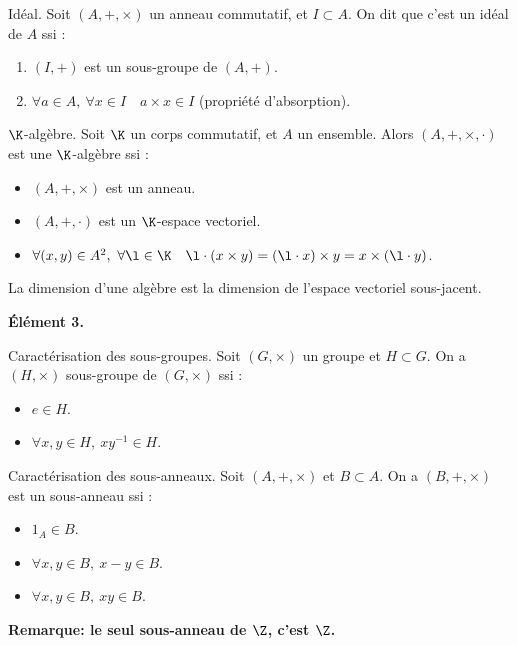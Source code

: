 \documentclass[11pt]{article}
\begin{document}
\begin{defi}{Idéal.  }{}
    Soit $(A,+,\times)$ un anneau commutatif, et $I\subset A$. On dit que c'est un idéal de $A$ ssi :
    \begin{enumerate}
        \item $(I,+)$ est un sous-groupe de $(A,+)$.
        \item $\forall a \in A, ~ \forall x \in I \quad a\times x \in I$ (propriété d'absorption).
    \end{enumerate}
\end{defi}

\begin{defi}{$\K$-algèbre.}{}
    Soit $\K$ un corps commutatif, et $A$ un ensemble. Alors $(A,+,\times,\cdot)$ est une $\K$-algèbre ssi :
    \begin{itemize}
        \item $(A,+,\times)$ est un anneau.
        \item $(A,+,\cdot)$ est un $\K$-espace vectoriel.
        \item $\forall (x,y)\in A^2, ~ \forall \l \in \K \quad \l\cdot(x\times y)=(\l\cdot x) \times y=x\times(\l\cdot y)$.
    \end{itemize}
    La dimension d'une algèbre est la dimension de l'espace vectoriel sous-jacent.
\end{defi}

\begin{center}
    \bf{Élément 3.}
\end{center}

\begin{prop}{Caractérisation des sous-groupes.}{}
    Soit $(G,\times)$ un groupe et $H\subset G$. On a $(H,\times)$ sous-groupe de $(G,\times)$ ssi :
    \begin{itemize}
        \item $e\in H$.
        \item $\forall x,y \in H, ~ xy^{-1}\in H$.
    \end{itemize}
\end{prop}

\begin{prop}{Caractérisation des sous-anneaux.}{}
    Soit $(A,+,\times)$ et $B\subset A$. On a $(B,+,\times)$ est un sous-anneau ssi :
    \begin{itemize}
        \item $1_A\in B$.
        \item $\forall x,y \in B, ~ x-y\in B$.
        \item $\forall x,y \in B, ~ xy\in B$.
    \end{itemize}
    \bf{Remarque:} le seul sous-anneau de $\Z$, c'est $\Z$.
\end{prop}
\end{document}
